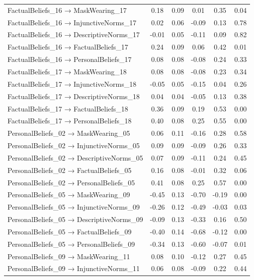 \documentclass[
  man, donotrepeattitle,floatsintext]{apa6}
\begin{document}
\begin{center}
\begin{ThreePartTable}
{\begin{longtable}{lccccc}
FactualBeliefs\_16 → MaskWearing\_17 & 0.18 & 0.09 & 0.01 & 0.35 & 0.04\\
FactualBeliefs\_16 → InjunctiveNorms\_17 & 0.02 & 0.06 & -0.09 & 0.13 & 0.78\\
FactualBeliefs\_16 → DescriptiveNorms\_17 & -0.01 & 0.05 & -0.11 & 0.09 & 0.82\\
FactualBeliefs\_16 → FactualBeliefs\_17 & 0.24 & 0.09 & 0.06 & 0.42 & 0.01\\
FactualBeliefs\_16 → PersonalBeliefs\_17 & 0.08 & 0.08 & -0.08 & 0.24 & 0.33\\
FactualBeliefs\_17 → MaskWearing\_18 & 0.08 & 0.08 & -0.08 & 0.23 & 0.34\\
FactualBeliefs\_17 → InjunctiveNorms\_18 & -0.05 & 0.05 & -0.15 & 0.04 & 0.26\\
FactualBeliefs\_17 → DescriptiveNorms\_18 & 0.04 & 0.04 & -0.05 & 0.13 & 0.38\\
FactualBeliefs\_17 → FactualBeliefs\_18 & 0.36 & 0.09 & 0.19 & 0.53 & 0.00\\
FactualBeliefs\_17 → PersonalBeliefs\_18 & 0.40 & 0.08 & 0.25 & 0.55 & 0.00\\
PersonalBeliefs\_02 → MaskWearing\_05 & 0.06 & 0.11 & -0.16 & 0.28 & 0.58\\
PersonalBeliefs\_02 → InjunctiveNorms\_05 & 0.09 & 0.09 & -0.09 & 0.26 & 0.33\\
PersonalBeliefs\_02 → DescriptiveNorms\_05 & 0.07 & 0.09 & -0.11 & 0.24 & 0.45\\
PersonalBeliefs\_02 → FactualBeliefs\_05 & 0.16 & 0.08 & -0.01 & 0.32 & 0.06\\
PersonalBeliefs\_02 → PersonalBeliefs\_05 & 0.41 & 0.08 & 0.25 & 0.57 & 0.00\\
PersonalBeliefs\_05 → MaskWearing\_09 & -0.45 & 0.13 & -0.70 & -0.19 & 0.00\\
PersonalBeliefs\_05 → InjunctiveNorms\_09 & -0.26 & 0.12 & -0.49 & -0.03 & 0.03\\
PersonalBeliefs\_05 → DescriptiveNorms\_09 & -0.09 & 0.13 & -0.33 & 0.16 & 0.50\\
PersonalBeliefs\_05 → FactualBeliefs\_09 & -0.40 & 0.14 & -0.68 & -0.12 & 0.00\\
PersonalBeliefs\_05 → PersonalBeliefs\_09 & -0.34 & 0.13 & -0.60 & -0.07 & 0.01\\
PersonalBeliefs\_09 → MaskWearing\_11 & 0.08 & 0.10 & -0.12 & 0.27 & 0.45\\
PersonalBeliefs\_09 → InjunctiveNorms\_11 & 0.06 & 0.08 & -0.09 & 0.22 & 0.44\\

\end{longtable}}
\end{ThreePartTable}
\end{center}
\end{document}
